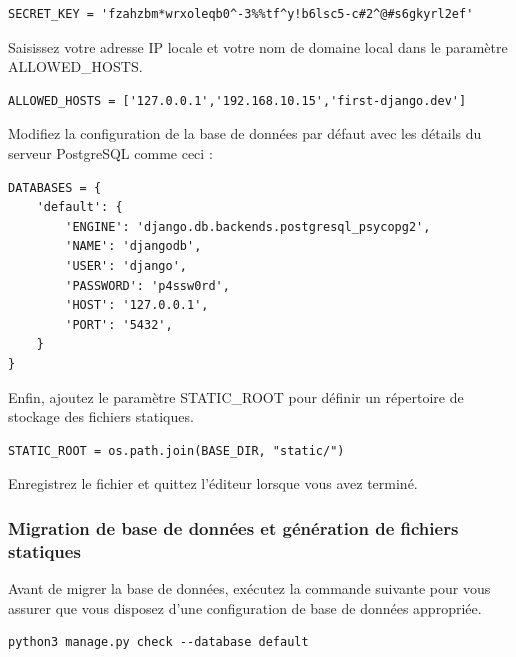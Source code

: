 \documentclass{article}
\begin{document}
\begin{verbatim}
SECRET_KEY = 'fzahzbm*wrxoleqb0^-3%%tf^y!b6lsc5-c#2^@#s6gkyrl2ef'
\end{verbatim}

Saisissez votre adresse IP locale et votre nom de domaine local dans le paramètre ALLOWED\_HOSTS.

\begin{verbatim}
ALLOWED_HOSTS = ['127.0.0.1','192.168.10.15','first-django.dev']
\end{verbatim}

Modifiez la configuration de la base de données par défaut avec les détails du serveur PostgreSQL comme ceci :

\begin{verbatim}
DATABASES = {
    'default': {
        'ENGINE': 'django.db.backends.postgresql_psycopg2',
        'NAME': 'djangodb',
        'USER': 'django',
        'PASSWORD': 'p4ssw0rd',
        'HOST': '127.0.0.1',
        'PORT': '5432',
    }
}
\end{verbatim}

Enfin, ajoutez le paramètre STATIC\_ROOT pour définir un répertoire de stockage des fichiers statiques.

\begin{verbatim}
STATIC_ROOT = os.path.join(BASE_DIR, "static/")
\end{verbatim}

Enregistrez le fichier et quittez l'éditeur lorsque vous avez terminé.

\subsubsection{Migration de base de données et génération de fichiers statiques}
Avant de migrer la base de données, exécutez la commande suivante pour vous assurer que vous disposez d'une configuration de base de données appropriée.

\begin{verbatim}
python3 manage.py check --database default
\end{verbatim}
\end{document}
